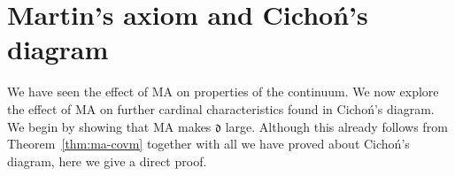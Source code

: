 \documentclass[11pt,oneside]{amsbook}
\newcommand{\set}[1]{\left\{\,#1\,\right\}}
\newcommand{\PP}{\mathbb P}
\newcommand{\Meager}{\mathcal M}
\DeclareMathOperator{\dom}{dom}
\DeclareMathOperator{\cov}{\mathsf{cov}}
\DeclareMathOperator{\Diff}{Diff}
\theoremstyle{definition}
\theoremstyle{plain}
\theoremstyle{definition}
\theoremstyle{remark}
\begin{document}





\section{Martin's axiom and Cicho\'n's diagram}

We have seen the effect of MA on properties of the continuum. We now explore the effect of MA on further cardinal characteristics found in Cicho\'n's diagram. We begin by showing that MA makes $\mathfrak d$ large. Although this already follows from Theorem~\ref{thm:ma-covm} together with all we have proved about Cicho\'n's diagram, here we give a direct proof.
\end{document}
